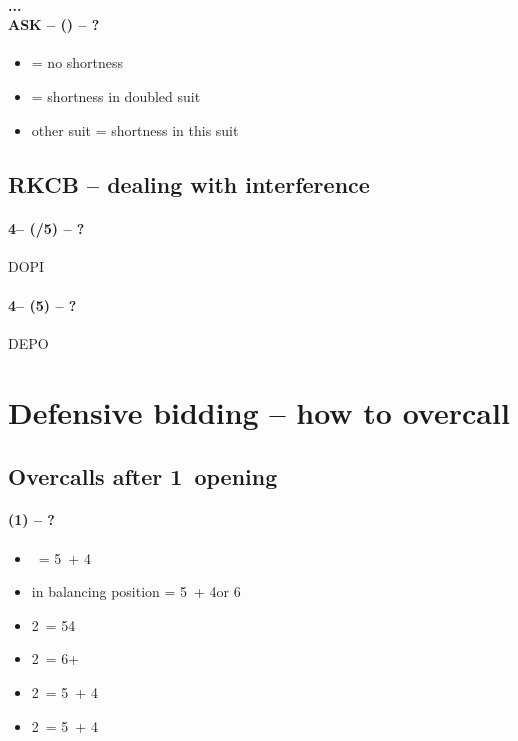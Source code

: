 \subsubsection*{...\\{\color{WildStrawberry}\textbf{ASK}\color{black}} -- (\dbl) -- ?}
\begin{itemize}
    \item \rdbl = no shortness
    \item \pass = shortness in doubled suit
    \item other suit = shortness in this suit
\end{itemize}

\section{\texorpdfstring{RKCB -- dealing with interference}{RKCBinterference}}\label{sec:RKCBinterference}

\subsubsection*{4\nt -- (\dbl/5\minor) -- ?}
DOPI

\subsubsection*{4\nt -- (5\major) -- ?}
DEPO

\chapter{Defensive bidding -- how to overcall}\label{chap:defensive}
\section{\texorpdfstring{Overcalls after 1\ntx\ opening}{overcallsAfter1nt}}\label{sec:overcallsAfter1nt}

\subsubsection*{(1\ntx) -- ?}
\begin{itemize}
    \item \dbl\ = 5\minor\ + 4\major
    \item \dbl in balancing position = 5\minor\ + 4\major or 6\minor
    \item 2\clubs\ = 54 \major
    \item 2\diams\ = 6+ \major
    \item 2\hearts\ = 5\hearts\ + 4\minor
    \item 2\spades\ = 5\spades\ + 4\minor
\end{itemize}

